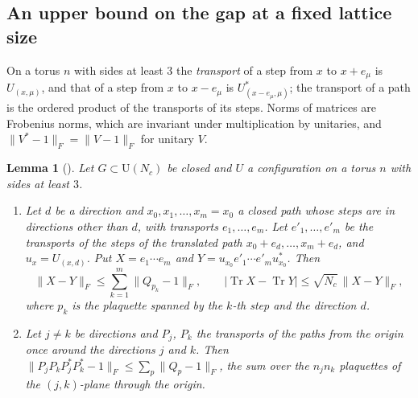 \documentclass[11pt,a4paper]{amsart}
\newtheorem{lemma}[theorem]{Lemma}
\theoremstyle{definition}
\theoremstyle{remark}
\numberwithin{equation}{section}
\DeclareMathOperator{\Tr}{Tr}        %
\newcommand{\norm}[1]{\lVert #1\rVert}     %
\newcommand{\abs}[1]{\lvert #1\rvert}      %
\newcommand{\U}{\mathrm{U}}                %
\begin{document}
\subsection{An upper bound on the gap at a fixed lattice size}

On a torus $n$ with sides at least $3$ the \emph{transport} of a step from $x$ to $x+e_\mu$ is $U_{(x,\mu)}$, and that of a step from $x$ to $x-e_\mu$ is $U^*_{(x-e_\mu,\mu)}$; the transport of a path is the ordered product of the transports of its steps. Norms of matrices are Frobenius norms, which are invariant under multiplication by unitaries, and $\norm{V^*-1}_F=\norm{V-1}_F$ for unitary $V$.

\begin{lemma}[{\cite[Theorem~8, Steps~3 and~4]{bhattacharjee2026first}}]\label{lem:fp-strip}
Let $G\subset\U(N_c)$ be closed and $U$ a configuration on a torus $n$ with sides at least $3$.
\begin{enumerate}[label=(\alph*),leftmargin=2.2em]
\item Let $d$ be a direction and $x_0,x_1,\dots,x_m=x_0$ a closed path whose steps are in directions other than $d$, with transports $e_1,\dots,e_m$. Let $e'_1,\dots,e'_m$ be the transports of the steps of the translated path $x_0+e_d,\dots,x_m+e_d$, and $u_x=U_{(x,d)}$. Put $X=e_1\cdots e_m$ and $Y=u_{x_0}e'_1\cdots e'_mu^*_{x_0}$. Then
\[
\norm{X-Y}_F\le\sum_{k=1}^m\norm{Q_{p_k}-1}_F,\qquad \abs{\Tr X-\Tr Y}\le\sqrt{N_c}\,\norm{X-Y}_F,
\]
where $p_k$ is the plaquette spanned by the $k$-th step and the direction $d$.
\item Let $j\ne k$ be directions and $P_j$, $P_k$ the transports of the paths from the origin once around the directions $j$ and $k$. Then $\norm{P_jP_kP_j^*P_k^*-1}_F\le\sum_p\norm{Q_p-1}_F$, the sum over the $n_jn_k$ plaquettes of the $(j,k)$-plane through the origin.
\end{enumerate}
\end{lemma}
\end{document}
